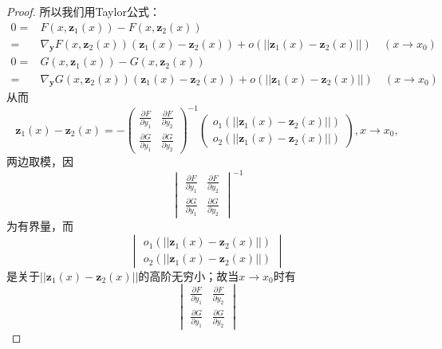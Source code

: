 \documentclass[UTF8]{ctexart}
\begin{document}
\begin{proof}
            所以我们用Taylor公式：
            \begin{align}
                0=&F(x,\boldsymbol{z}_1(x))-F(x,\boldsymbol{z}_2(x))\\
                =&\nabla_{\boldsymbol{y}} F(x,\boldsymbol{z}_2(x))(\boldsymbol{z}_1(x)-\boldsymbol{z}_2(x))+o(||\boldsymbol{z}_1(x)-\boldsymbol{z}_2(x)||) \quad (x\to x_0)
            \end{align}
            \begin{align}
                0=&G(x,\boldsymbol{z}_1(x))-G(x,\boldsymbol{z}_2(x))\\
                =&\nabla_{\boldsymbol{y}} G(x,\boldsymbol{z}_2(x))(\boldsymbol{z}_1(x)-\boldsymbol{z}_2(x))+o(||\boldsymbol{z}_1(x)-\boldsymbol{z}_2(x)||) \quad (x\to x_0)
            \end{align}
            从而
            $$\boldsymbol{z}_1(x)-\boldsymbol{z}_2(x)=-\begin{pmatrix}
                \frac{\partial F}{\partial y_1} & \frac{\partial F}{\partial y_2}\\
                \frac{\partial G}{\partial y_1} & \frac{\partial G}{\partial y_2}
            \end{pmatrix}^{-1}\begin{pmatrix}
                o_1(||\boldsymbol{z}_1(x)-\boldsymbol{z}_2(x)||)\\
                o_2(||\boldsymbol{z}_1(x)-\boldsymbol{z}_2(x)||)
            \end{pmatrix},x\to x_0,$$
            两边取模，因$$\begin{vmatrix}
                \frac{\partial F}{\partial y_1} & \frac{\partial F}{\partial y_2}\\
                \frac{\partial G}{\partial y_1} & \frac{\partial G}{\partial y_2}
            \end{vmatrix}^{-1}$$为有界量，而
            $$\begin{vmatrix}
                o_1(||\boldsymbol{z}_1(x)-\boldsymbol{z}_2(x)||)\\
                o_2(||\boldsymbol{z}_1(x)-\boldsymbol{z}_2(x)||)
            \end{vmatrix}$$是关于$||\boldsymbol{z}_1(x)-\boldsymbol{z}_2(x)||$的高阶无穷小；\label{无穷小}故当$x\to x_0$时有
            $$\begin{vmatrix}
                \frac{\partial F}{\partial y_1} & \frac{\partial F}{\partial y_2}\\
                \frac{\partial G}{\partial y_1} & \frac{\partial G}{\partial y_2}

\end{vmatrix}$$
\end{proof}
\end{document}
